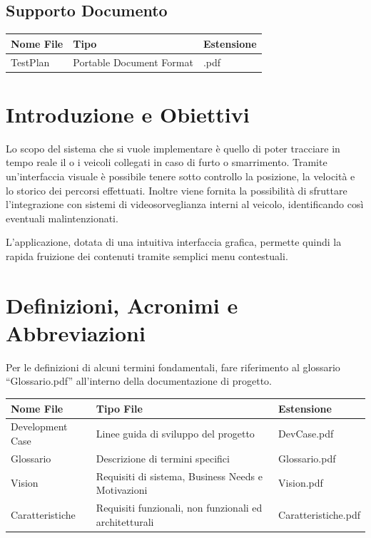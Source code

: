 \documentclass[a4paper,12pt]{article}
\begin{document}
\subsection{Supporto Documento}
\begin{table}[ht]
\begin{center}
\begin{tabular}{p{6cm} p{5cm} p{2cm}}
\rowcolor{Ash}
\hline
Nome File & Tipo & Estensione \\ \hline
TestPlan & Portable Document Format & .pdf \\ \hline
\end{tabular}
\end{center}
\end{table}

\clearpage

\pagebreak

\section{Introduzione e Obiettivi}

Lo scopo del sistema che si vuole implementare è quello di poter tracciare in tempo reale il o i veicoli collegati in caso di furto o smarrimento. Tramite un'interfaccia visuale è possibile tenere sotto controllo la posizione, la velocità e lo storico dei percorsi effettuati. Inoltre viene fornita la possibilità di sfruttare l'integrazione con sistemi di videosorveglianza interni al veicolo, identificando così eventuali malintenzionati. 

L'applicazione, dotata di una intuitiva interfaccia grafica, permette quindi la rapida fruizione dei contenuti tramite semplici menu contestuali.


\section{Definizioni, Acronimi e Abbreviazioni}

Per le definizioni di alcuni termini fondamentali, fare riferimento al glossario ``Glossario.pdf'' all'interno della documentazione di progetto.

\begin{table}[h]
\begin{center}
\begin{tabular}{ p{4.5cm} p{4.5cm} p{3.5cm} } 
\rowcolor{Ash}	
\hline	
Nome File & Tipo File & Estensione  \\ \hline
Development Case & Linee guida di sviluppo del progetto & DevCase.pdf  \\ 
Glossario & Descrizione di termini specifici & Glossario.pdf  \\ 
Vision & Requisiti di sistema, Business Needs e Motivazioni & Vision.pdf  \\ 
Caratteristiche & Requisiti funzionali, non funzionali ed architetturali & Caratteristiche.pdf  \\ \hline
\end{tabular}
\end{center}
\end{table}
\end{document}
